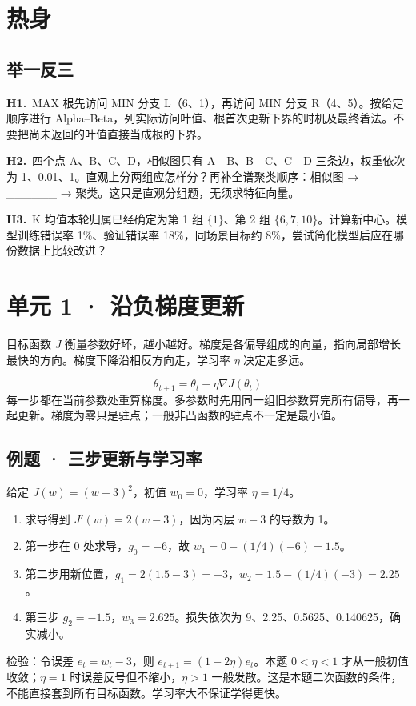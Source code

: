\documentclass[UTF8,a4paper,11pt]{ctexart}
\newcommand{\PracticeQuestion}[3]{\par\Needspace{4\baselineskip}\noindent\begin{minipage}{\linewidth}\textbf{#1.}\ #2\par\noindent\rule{0pt}{#3mm}\par\end{minipage}\par}
\begin{document}
\section{热身}
\subsection{举一反三}
\PracticeQuestion{H1}{MAX 根先访问 MIN 分支 L（6、1），再访问 MIN 分支 R（4、5）。按给定顺序进行 Alpha–Beta，列实际访问叶值、根首次更新下界的时机及最终着法。不要把尚未返回的叶值直接当成根的下界。}{35}
\PracticeQuestion{H2}{四个点 A、B、C、D，相似图只有 A—B、B—C、C—D 三条边，权重依次为 1、0.01、1。直观上分两组应怎样分？再补全谱聚类顺序：相似图 → \_\_\_\_\_\_ → 聚类。这只是直观分组题，无须求特征向量。}{35}
\PracticeQuestion{H3}{K 均值本轮归属已经确定为第 1 组 $\{1\}$、第 2 组 $\{6,7,10\}$。计算新中心。模型训练错误率 1\%、验证错误率 18\%，同场景目标约 8\%，尝试简化模型后应在哪份数据上比较改进？}{35}
\clearpage
\section{单元 1 · 沿负梯度更新}
目标函数 $J$ 衡量参数好坏，越小越好。梯度是各偏导组成的向量，指向局部增长最快的方向。梯度下降沿相反方向走，学习率 $\eta$ 决定走多远。

\[\theta_{t+1}=\theta_t-\eta\nabla J(\theta_t)\]
每一步都在当前参数处重算梯度。多参数时先用同一组旧参数算完所有偏导，再一起更新。梯度为零只是驻点；一般非凸函数的驻点不一定是最小值。

\subsection{例题 · 三步更新与学习率}
给定 $J(w)=(w-3)^2$，初值 $w_0=0$，学习率 $\eta=1/4$。

\begin{enumerate}
\item 求导得到 $J'(w)=2(w-3)$，因为内层 $w-3$ 的导数为 1。
\item 第一步在 0 处求导，$g_0=-6$，故 $w_1=0-(1/4)(-6)=1.5$。
\item 第二步用新位置，$g_1=2(1.5-3)=-3$，$w_2=1.5-(1/4)(-3)=2.25$。
\item 第三步 $g_2=-1.5$，$w_3=2.625$。损失依次为 9、2.25、0.5625、0.140625，确实减小。
\end{enumerate}
检验：令误差 $e_t=w_t-3$，则 $e_{t+1}=(1-2\eta)e_t$。本题 $0<\eta<1$ 才从一般初值收敛；$\eta=1$ 时误差反号但不缩小，$\eta>1$ 一般发散。这是本题二次函数的条件，不能直接套到所有目标函数。学习率大不保证学得更快。
\end{document}
